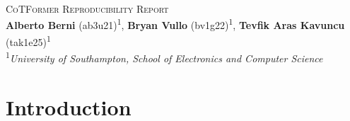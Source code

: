 \documentclass[10pt, letterpaper]{article} %
\begin{document}
\begin{center}
    {\LARGE \scshape CoTFormer Reproducibility Report} \\[1em]
    {\normalsize \textbf{Alberto Berni} (ab3u21)\textsuperscript{1}, \textbf{Bryan Vullo} (bv1g22)\textsuperscript{1}, \textbf{Tevfik Aras Kavuncu} (tak1e25)\textsuperscript{1}} \\[0.2em]
    {\normalsize \textsuperscript{1}\textit{University of Southampton, School of Electronics and Computer Science}}
\end{center}
\vspace{-0.5em}

\setlength{\parskip}{0.1cm}
\setlength{\parindent}{0cm}

\section{Introduction}\label{sec:intro}


\end{document}
